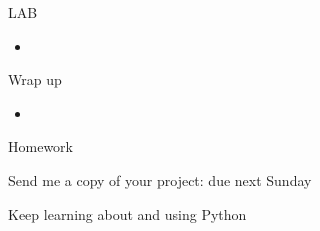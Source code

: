 \documentclass{beamer}
\begin{document}
\begin{frame}{LAB}

\begin{itemize}
  \item
\end{itemize}

\end{frame}

\begin{frame}{Wrap up}

\begin{itemize}
  \item
\end{itemize}

\end{frame}



\begin{frame}{Homework}

\vfill
{\Large Send me a copy of your project: due next Sunday}

\vfill
{\Large Keep learning about and using Python}
\vfill

\end{frame}
\end{document}
